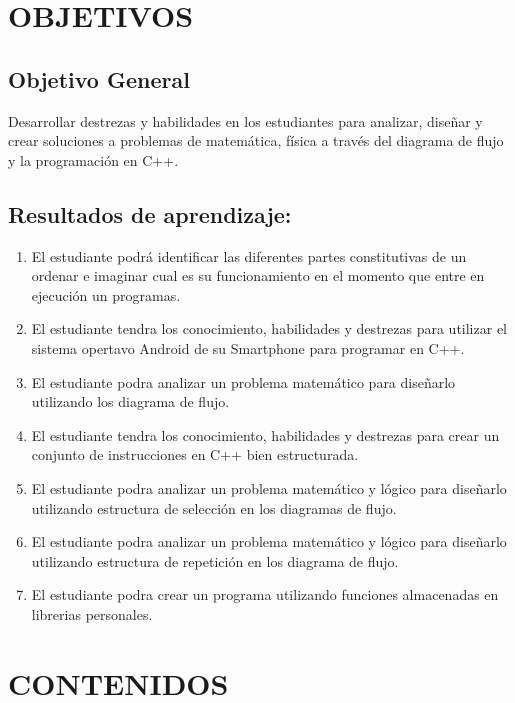 \documentclass[a4paper,12pt,spanish]{article}
\newcommand{\ResuApreA}{El estudiante podrá identificar las diferentes partes constitutivas de un ordenar e imaginar cual es su funcionamiento en el momento que entre en ejecución un programas.}
\newcommand{\ResuApreB}{El estudiante tendra los conocimiento, habilidades y destrezas para utilizar el sistema opertavo Android de su Smartphone para programar en C++.}
\newcommand{\ResuApreC}{El estudiante podra analizar un problema matemático para diseñarlo utilizando los diagrama de flujo.}
\newcommand{\ResuApreD}{El estudiante tendra los conocimiento, habilidades y destrezas para crear un conjunto de instrucciones en C++ bien estructurada.}
\newcommand{\ResuApreE}{El estudiante podra analizar un problema matemático y lógico para  diseñarlo utilizando estructura de selección en los diagramas de flujo.}
\newcommand{\ResuApreF}{El estudiante podra analizar un problema matemático y lógico para  diseñarlo utilizando estructura de repetición en los diagrama de flujo.}
\newcommand{\ResuApreG}{El estudiante podra crear un programa utilizando funciones almacenadas en librerias personales.}
\begin{document}
\newpage

\section{OBJETIVOS}
\subsection{Objetivo General}
Desarrollar destrezas y habilidades en los estudiantes para analizar, diseñar y crear soluciones a problemas de matemática, física a través del diagrama de flujo y la programación  en C++.

\subsection{Resultados de aprendizaje:}

\begin{enumerate}
\item \ResuApreA
\item \ResuApreB
\item \ResuApreC
\item \ResuApreD
\item \ResuApreE
\item \ResuApreF
\item \ResuApreG

\end{enumerate}


\section{CONTENIDOS}
\label{sec:contenidos}
\end{document}

